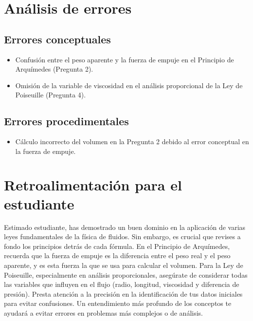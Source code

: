 \documentclass[11pt,a4paper]{article}
\begin{document}
\section*{Análisis de errores}

\subsection*{Errores conceptuales}
\begin{itemize}[leftmargin=1.5em, itemsep=2pt]
  \item Confusión entre el peso aparente y la fuerza de empuje en el Principio de Arquímedes (Pregunta 2).
  \item Omisión de la variable de viscosidad en el análisis proporcional de la Ley de Poiseuille (Pregunta 4).
\end{itemize}

\subsection*{Errores procedimentales}
\begin{itemize}[leftmargin=1.5em, itemsep=2pt]
  \item Cálculo incorrecto del volumen en la Pregunta 2 debido al error conceptual en la fuerza de empuje.
\end{itemize}

\section*{Retroalimentación para el estudiante}
\begin{tcolorbox}[cajaRecomendacion, title={Dirigido a: glanyernys perez 33171611}]
Estimado estudiante, has demostrado un buen dominio en la aplicación de varias leyes fundamentales de la física de fluidos. Sin embargo, es crucial que revises a fondo los principios detrás de cada fórmula. En el Principio de Arquímedes, recuerda que la fuerza de empuje es la diferencia entre el peso real y el peso aparente, y es esta fuerza la que se usa para calcular el volumen. Para la Ley de Poiseuille, especialmente en análisis proporcionales, asegúrate de considerar todas las variables que influyen en el flujo (radio, longitud, viscosidad y diferencia de presión). Presta atención a la precisión en la identificación de tus datos iniciales para evitar confusiones. Un entendimiento más profundo de los conceptos te ayudará a evitar errores en problemas más complejos o de análisis.
\end{tcolorbox}
\end{document}
